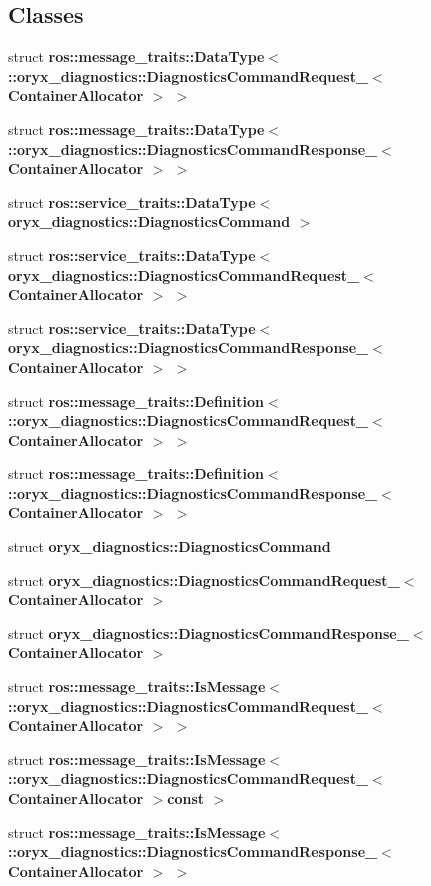 \subsection*{\-Classes}
\begin{DoxyCompactItemize}
\item 
struct {\bf ros\-::message\-\_\-traits\-::\-Data\-Type$<$ \-::oryx\-\_\-diagnostics\-::\-Diagnostics\-Command\-Request\-\_\-$<$ Container\-Allocator $>$ $>$}
\item 
struct {\bf ros\-::message\-\_\-traits\-::\-Data\-Type$<$ \-::oryx\-\_\-diagnostics\-::\-Diagnostics\-Command\-Response\-\_\-$<$ Container\-Allocator $>$ $>$}
\item 
struct {\bf ros\-::service\-\_\-traits\-::\-Data\-Type$<$ oryx\-\_\-diagnostics\-::\-Diagnostics\-Command $>$}
\item 
struct {\bf ros\-::service\-\_\-traits\-::\-Data\-Type$<$ oryx\-\_\-diagnostics\-::\-Diagnostics\-Command\-Request\-\_\-$<$ Container\-Allocator $>$ $>$}
\item 
struct {\bf ros\-::service\-\_\-traits\-::\-Data\-Type$<$ oryx\-\_\-diagnostics\-::\-Diagnostics\-Command\-Response\-\_\-$<$ Container\-Allocator $>$ $>$}
\item 
struct {\bf ros\-::message\-\_\-traits\-::\-Definition$<$ \-::oryx\-\_\-diagnostics\-::\-Diagnostics\-Command\-Request\-\_\-$<$ Container\-Allocator $>$ $>$}
\item 
struct {\bf ros\-::message\-\_\-traits\-::\-Definition$<$ \-::oryx\-\_\-diagnostics\-::\-Diagnostics\-Command\-Response\-\_\-$<$ Container\-Allocator $>$ $>$}
\item 
struct {\bf oryx\-\_\-diagnostics\-::\-Diagnostics\-Command}
\item 
struct {\bf oryx\-\_\-diagnostics\-::\-Diagnostics\-Command\-Request\-\_\-$<$ Container\-Allocator $>$}
\item 
struct {\bf oryx\-\_\-diagnostics\-::\-Diagnostics\-Command\-Response\-\_\-$<$ Container\-Allocator $>$}
\item 
struct {\bf ros\-::message\-\_\-traits\-::\-Is\-Message$<$ \-::oryx\-\_\-diagnostics\-::\-Diagnostics\-Command\-Request\-\_\-$<$ Container\-Allocator $>$ $>$}
\item 
struct {\bf ros\-::message\-\_\-traits\-::\-Is\-Message$<$ \-::oryx\-\_\-diagnostics\-::\-Diagnostics\-Command\-Request\-\_\-$<$ Container\-Allocator $>$const  $>$}
\item 
struct {\bf ros\-::message\-\_\-traits\-::\-Is\-Message$<$ \-::oryx\-\_\-diagnostics\-::\-Diagnostics\-Command\-Response\-\_\-$<$ Container\-Allocator $>$ $>$}

\end{DoxyCompactItemize}
